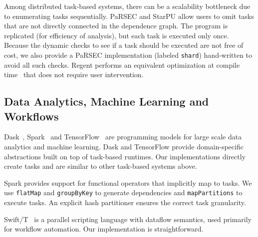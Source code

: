 Among distributed task-based systems, there can be a scalability
bottleneck due to enumerating tasks sequentially. PaRSEC and StarPU
allow users to omit tasks that are not
directly connected in the dependence graph. The program is replicated
(for efficiency of analysis), but each task is executed only
once. Because the dynamic checks to see if a task should be executed
are not free of cost, we also provide a PaRSEC implementation (labeled \lstinline{shard}) hand-written to avoid all
such checks. Regent performs an equivalent optimization at compile
time~\cite{ControlReplication17} that does not require user
intervention.

\subsection{Data Analytics, Machine Learning and Workflows}

Dask~\cite{Dask15}, Spark~\cite{Spark10} and
TensorFlow~\cite{TensorFlow15} are programming models for large scale
data analytics and machine learning. Dask and TensorFlow provide
domain-specific abstractions built on top of task-based runtimes. Our
implementations directly create tasks and are similar to other
task-based systems above.

Spark provides support for functional operators that implicitly map to
tasks. We use \lstinline[language=Scala]{flatMap} and
\lstinline[language=Scala]{groupByKey} to generate dependencies and
\lstinline[language=Scala]{mapPartitions} to execute tasks. An
explicit hash partitioner ensures the correct task granularity.

Swift/T~\cite{Wozniak13} is a parallel scripting language
with dataflow semantics, used primarily for workflow automation. Our
implementation is straightforward.
